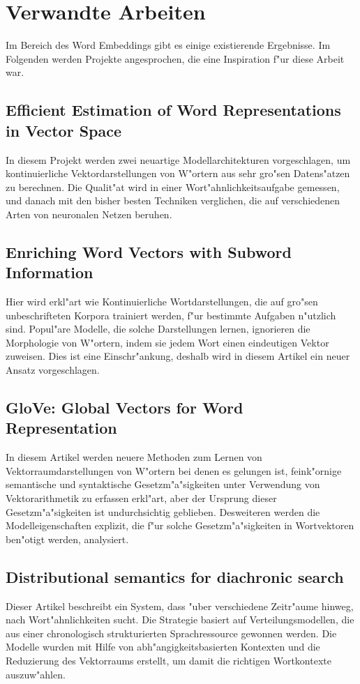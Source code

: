 \chapter{Verwandte Arbeiten}

Im Bereich des Word Embeddings gibt es einige existierende Ergebnisse.
Im Folgenden werden Projekte angesprochen, die eine Inspiration f"ur diese Arbeit war.\\

\section{Efficient Estimation of Word Representations in Vector Space}
In diesem Projekt werden zwei neuartige Modellarchitekturen vorgeschlagen, um kontinuierliche Vektordarstellungen von W"ortern aus sehr gro"sen Datens"atzen zu berechnen. Die Qualit"at wird in einer Wort"ahnlichkeitsaufgabe gemessen, und danach mit den bisher besten Techniken verglichen, die auf verschiedenen Arten von neuronalen Netzen beruhen.
\cite{Mikolov2013}
\section{Enriching Word Vectors with Subword Information}
Hier wird erkl"art wie Kontinuierliche Wortdarstellungen, die auf gro"sen unbeschrifteten Korpora trainiert werden, f"ur bestimmte Aufgaben n"utzlich sind. Popul"are Modelle, die solche Darstellungen lernen, ignorieren die Morphologie von W"ortern, indem sie jedem Wort einen eindeutigen Vektor zuweisen. Dies ist eine Einschr"ankung, deshalb wird in diesem Artikel ein neuer Ansatz vorgeschlagen.
\cite{Bojanowski2017}
\section{GloVe: Global Vectors for Word Representation}
In diesem Artikel werden neuere Methoden zum Lernen von Vektorraumdarstellungen von W"ortern bei denen es gelungen ist, feink"ornige semantische und syntaktische Gesetzm"a"sigkeiten unter Verwendung von Vektorarithmetik zu erfassen erkl"art, aber der Ursprung dieser Gesetzm"a"sigkeiten ist undurchsichtig geblieben. Desweiteren werden die Modelleigenschaften explizit, die f"ur solche Gesetzm"a"sigkeiten in Wortvektoren ben"otigt werden, analysiert.
\cite{Pennington2014}
\section{Distributional semantics for diachronic search}
Dieser Artikel beschreibt ein System, dass "uber verschiedene Zeitr"aume hinweg, nach Wort"ahnlichkeiten sucht. Die Strategie basiert auf Verteilungsmodellen, die aus einer chronologisch strukturierten Sprachressource gewonnen werden. Die Modelle wurden mit Hilfe von abh"angigkeitsbasierten Kontexten und die Reduzierung des Vektorraums erstellt, um damit die richtigen Wortkontexte auszuw"ahlen.
\cite{Gamallo2017}
